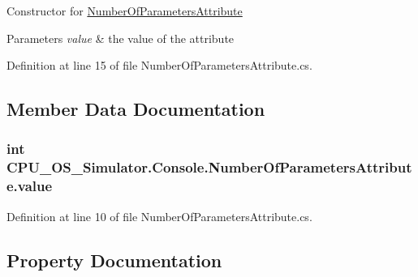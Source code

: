 Constructor for \hyperlink{class_c_p_u___o_s___simulator_1_1_console_1_1_number_of_parameters_attribute}{Number\+Of\+Parameters\+Attribute} 


\begin{DoxyParams}{Parameters}
{\em value} & the value of the attribute\\
\hline
\end{DoxyParams}


Definition at line 15 of file Number\+Of\+Parameters\+Attribute.\+cs.



\subsection{Member Data Documentation}
\hypertarget{class_c_p_u___o_s___simulator_1_1_console_1_1_number_of_parameters_attribute_a74f66203060602ef8135280692dc2064}{}
\subsubsection[{value}]{\setlength{\rightskip}{0pt plus 5cm}int C\+P\+U\+\_\+\+O\+S\+\_\+\+Simulator.\+Console.\+Number\+Of\+Parameters\+Attribute.\+value\hspace{0.3cm}{\ttfamily [private]}}\label{class_c_p_u___o_s___simulator_1_1_console_1_1_number_of_parameters_attribute_a74f66203060602ef8135280692dc2064}


Definition at line 10 of file Number\+Of\+Parameters\+Attribute.\+cs.



\subsection{Property Documentation}
\hypertarget{class_c_p_u___o_s___simulator_1_1_console_1_1_number_of_parameters_attribute_a7e083af44b45e3e68868d0d5d1991000}{}

